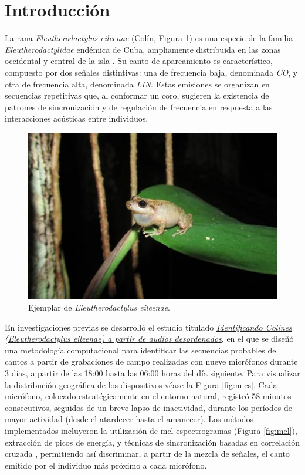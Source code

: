 \documentclass[a4paper,10pt,twocolumn]{article}
\begin{document}
\section{Introducción}\label{sec:intro}
La rana \emph{Eleutherodactylus eileenae} (Colín, Figura \ref{fig:elena}) es una 
especie de la familia \emph{Eleutherodactylidae} endémica 
de Cuba, ampliamente distribuida en las zonas occidental y 
central de la isla \cite{alonso2001patrones}. Su canto de 
apareamiento es característico, compuesto por dos señales 
distintivas: una de frecuencia baja, denominada \emph{CO}, y 
otra de frecuencia alta, denominada \emph{LIN}. Estas emisiones 
se organizan en secuencias repetitivas que, al conformar un 
coro, sugieren la existencia de patrones de sincronización y 
de regulación de frecuencia en respuesta a las interacciones 
acústicas entre individuos.

\begin{figure}[htbp]
    \centering
    \includegraphics[width=\columnwidth]{assets/elena.jpg}
    \caption{Ejemplar de \emph{Eleutherodactylus eileenae}.}
    \label{fig:elena}
\end{figure}

En investigaciones previas se desarrolló el estudio titulado 
\href{https://github.com/DanielMPMatCom/Identifying-Colines.-JCE-MatCom.git}{\emph{Identificando Colines (Eleutherodactylus eileenae) a 
partir de audios desordenados}}, en el que se diseñó una 
metodología computacional para identificar las secuencias 
probables de cantos a partir de grabaciones de campo realizadas 
con nueve micrófonos durante 3 días, a partir de las 18:00 hasta 
las 06:00 horas del día siguiente. Para visualizar la 
distribución geográfica de los 
dispositivos véase la Figura \ref{fig:mics}.
Cada micrófono, colocado 
estratégicamente en el entorno natural, registró 58 minutos 
consecutivos, seguidos de un breve lapso de inactividad, 
durante los períodos de mayor actividad (desde el atardecer 
hasta el amanecer). Los métodos implementados incluyeron la 
utilización de mel-espectrogramas \cite{zhang2021acoustic} (Figura \ref{fig:mel}), extracción de picos de 
energía, y técnicas de sincronización basadas en correlación 
cruzada \cite{costa2021comparing}, permitiendo así discriminar, a partir de la mezcla de 
señales, el canto emitido por el individuo más próximo a cada 
micrófono. 
\end{document}
